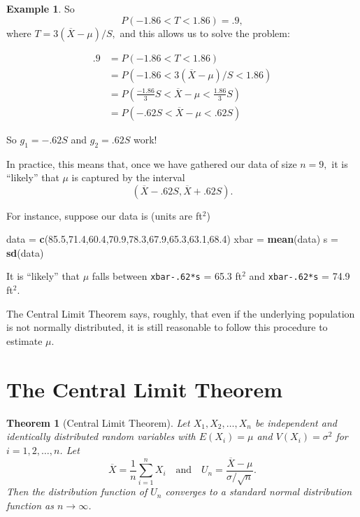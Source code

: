 \documentclass[
]{book}
\newenvironment{Shaded}{\begin{snugshade}}{\end{snugshade}}
\newcommand{\FloatTok}[1]{\textcolor[rgb]{0.00,0.00,0.81}{#1}}
\newcommand{\FunctionTok}[1]{\textcolor[rgb]{0.13,0.29,0.53}{\textbf{#1}}}
\newcommand{\NormalTok}[1]{#1}
\newcommand{\OtherTok}[1]{\textcolor[rgb]{0.56,0.35,0.01}{#1}}
\newtheorem{theorem}{Theorem}[chapter]
\theoremstyle{definition}
\theoremstyle{definition}
\newtheorem{example}{Example}[chapter]
\theoremstyle{definition}
\theoremstyle{definition}
\theoremstyle{remark}
\begin{document}
\begin{example}
So \[P(-1.86 < T < 1.86) = .9,\]
where \(T = 3(\overline{X}-\mu)/S,\) and this allows us to solve the problem:

\begin{align*}
.9 &= P(-1.86 < T < 1.86)\\
    &= P(-1.86 < 3(\overline{X}-\mu)/S < 1.86) \\
    &= P(\frac{-1.86}{3}S < \overline{X}-\mu < \frac{1.86}{3}S )\\
    &= P(-.62 S < \overline{X}-\mu < .62 S)
\end{align*}

So \(g_1 = -.62S\) and \(g_2 = .62S\) work!

In practice, this means that, once we have gathered our data of size \(n = 9,\) it is ``likely'' that \(\mu\) is captured by the interval \[(\overline{X} - .62S, \overline{X} + .62S).\]

For instance, suppose our data is (units are ft\(^2\))

\begin{Shaded}
\begin{Highlighting}[]
\NormalTok{data }\OtherTok{=} \FunctionTok{c}\NormalTok{(}\FloatTok{85.5}\NormalTok{,}\FloatTok{71.4}\NormalTok{,}\FloatTok{60.4}\NormalTok{,}\FloatTok{70.9}\NormalTok{,}\FloatTok{78.3}\NormalTok{,}\FloatTok{67.9}\NormalTok{,}\FloatTok{65.3}\NormalTok{,}\FloatTok{63.1}\NormalTok{,}\FloatTok{68.4}\NormalTok{)}
\NormalTok{xbar }\OtherTok{=} \FunctionTok{mean}\NormalTok{(data)}
\NormalTok{s }\OtherTok{=} \FunctionTok{sd}\NormalTok{(data)}
\end{Highlighting}
\end{Shaded}

It is ``likely'' that \(\mu\) falls between \texttt{xbar-.62*s} = 65.3 ft\(^2\) and \texttt{xbar-.62*s} = 74.9 ft\(^2\).
\end{example}

The Central Limit Theorem says, roughly, that even if the underlying population is not normally distributed, it is still reasonable to follow this procedure to estimate \(\mu\).

\section{The Central Limit Theorem}\label{the-central-limit-theorem}

\begin{theorem}[Central Limit Theorem]
\protect\hypertarget{thm:clt}{}\label{thm:clt}Let \(X_1, X_2, \ldots, X_n\) be independent and identically distributed random variables with \(E(X_i) = \mu\) and \(V(X_i) = \sigma^2\) for \(i = 1,2,\ldots,n\). Let \[\overline{X} = \frac{1}{n}\sum_{i=1}^n X_i ~~~ \text{ and } ~~~ U_n = \frac{\overline{X}-\mu}{\sigma/\sqrt{n}}.\]
Then the distribution function of \(U_n\) converges to a standard normal distribution function as \(n \to \infty\).
\end{theorem}
\end{document}
